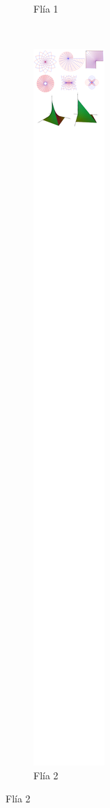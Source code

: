 \begin{figure}[t!]
\begin{subfigure}[t]{0.5\textwidth}
\caption{Flía 1}
\end{subfigure}%
~
\begin{subfigure}[t]{0.5\textwidth}
\centering
\includegraphics[scale=0.4,trim={358px 9876px 267px 24px},clip]{images/04_analisis2/am2.png}
\caption{Flía 2}
\end{subfigure}


\end{figure}
